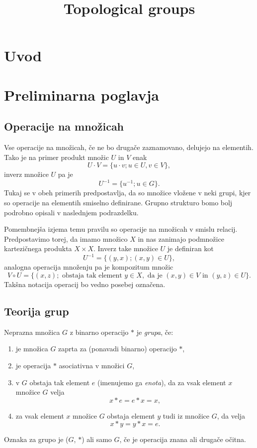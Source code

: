 \documentclass[mat1]{fmfdelo}
\title{Topological groups}
\begin{document}
\section{Uvod}

\section{Preliminarna poglavja}

\subsection{Operacije na množicah}\label{sec:opnamnozicah}
Vse operacije na množicah, če ne bo drugače zaznamovano, delujejo na elementih. Tako je na primer produkt množic $U$ in $V$ enak \[U \cdot V = \lbrace u \cdot v ; u \in U, v \in V \rbrace, \] inverz množice $U$ pa je \[ U^{-1} = \lbrace u^{-1} ; u \in G \rbrace. \] Tukaj se v obeh primerih predpostavlja, da so množice vložene v neki grupi, kjer so operacije na elementih smiselno definirane. Grupno strukturo bomo bolj podrobno opisali v naslednjem podrazdelku.

Pomembnejša izjema temu pravilu so operacije na množicah v smislu relacij. Predpostavimo torej, da imamo množico $X$ in nas zanimajo podmnožice kartezičnega produkta $X \times X$. Inverz take množice $U$ je definiran kot \[ U^{-1} = \lbrace (y, x) ; (x, y) \in U \rbrace, \]
analogna operacija množenju pa je kompozitum množic \[ V \circ U = \lbrace (x, z) ; \text{ obstaja tak element } y \in X, \text{ da je } (x, y) \in V \text{ in } (y, z) \in U \rbrace. \]
Takšna notacija operacij bo vedno posebej označena.

\subsection{Teorija grup}
\begin{definicija}\label{def:grupa}
Neprazna množica $G$ z binarno operacijo $*$ je \emph{grupa}, če:
\begin{enumerate}
\item je množica $G$ zaprta za (ponavadi binarno) operacijo $*$,
\item je operacija $*$ asociativna v množici $G$,
\item v $G$ obstaja tak element $e$ (imenujemo ga \emph{enota}), da za vsak element $x$ množice $G$ velja \[ x*e = e*x = x, \]
\item za vsak element $x$ množice $G$ obstaja element $y$ tudi iz množice $G$, da velja \[ x*y = y*x = e. \]
\end{enumerate}
Oznaka za grupo je ($G$, $*$) ali samo $G$, če je operacija znana ali drugače očitna. 
\end{definicija}
\end{document}
